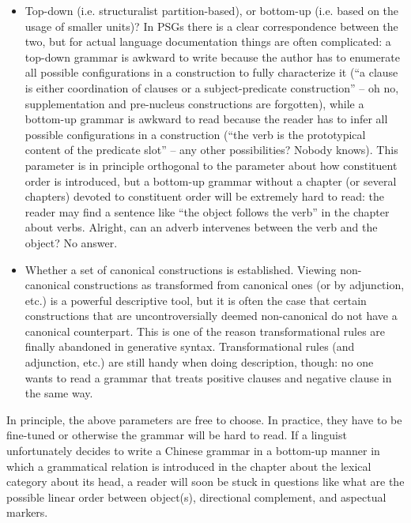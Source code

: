 \documentclass{article}
\begin{document}
\begin{itemize}
    \item Top-down (i.e. structuralist partition-based), 
    or bottom-up (i.e. based on the usage of smaller units)? 
    In PSGs there is a clear correspondence between the two, 
    but for actual language documentation things are often complicated:
    a top-down grammar is awkward to write 
    because the author has to enumerate all possible configurations in a construction 
    to fully characterize it
    (``a clause is either coordination of clauses or a subject-predicate construction''
    -- oh no, supplementation and pre-nucleus constructions are forgotten),
    while a bottom-up grammar is awkward to read 
    because the reader has to infer all possible configurations in a construction 
    (``the verb is the prototypical content of the predicate slot''
    -- any other possibilities? Nobody knows).
    This parameter is in principle orthogonal to the parameter about how constituent order is introduced,
    but a bottom-up grammar without a chapter (or several chapters) devoted to constituent order 
    will be extremely hard to read:
    the reader may find a sentence like ``the object follows the verb'' in the chapter about verbs.
    Alright, can an adverb intervenes between the verb and the object? No answer.

    \item Whether a set of canonical constructions is established.
    Viewing non-canonical constructions as transformed from canonical ones (or by adjunction, etc.) 
    is a powerful descriptive tool,
    but it is often the case that certain constructions 
    that are uncontroversially deemed non-canonical do not have a canonical counterpart.
    This is one of the reason transformational rules are finally abandoned in generative syntax.
    Transformational rules (and adjunction, etc.) are still handy when doing description, though:
    no one wants to read a grammar that treats positive clauses and negative clause in the same way.
\end{itemize}

In principle, the above parameters are free to choose.
In practice, they have to be fine-tuned or otherwise the grammar will be hard to read.
If a linguist unfortunately decides to write a Chinese grammar 
in a bottom-up manner
in which a grammatical relation is introduced in the chapter about the lexical category about its head,
a reader will soon be stuck in questions like 
what are the possible linear order between object(s), directional complement, and aspectual markers.
\end{document}
